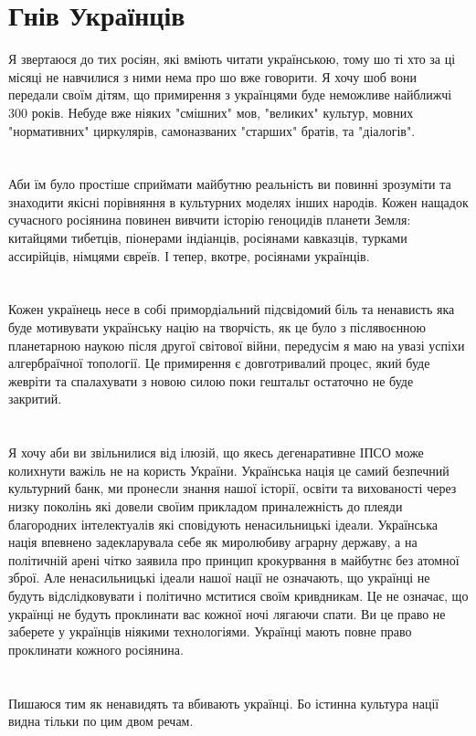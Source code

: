 \section{Гнів Українців}

Я звертаюся до тих росіян, які вміють читати українською, тому шо ті хто за ці місяці не навчилися з ними нема про шо вже говорити. Я хочу шоб вони передали своїм дітям, що примирення з українцями буде неможливе найближчі 300 років. Небуде вже ніяких "смішних" мов, "великих" культур, мовних "нормативних" циркулярів, самоназваних "старших" братів, та "діалогів".\\
\\
\\
Аби їм було простіше сприймати майбутню реальність ви повинні зрозуміти та знаходити якісні порівняння в культурних моделях інших народів. Кожен нащадок сучасного росіянина повинен вивчити історію геноцидів планети Земля: китайцями тибетців, піонерами індіанців, росіянами кавказців, турками ассирійців, німцями євреїв. І тепер, вкотре, росіянами українців.\\
\\
\\
Кожен українець несе в собі примордіальний підсвідомий біль та ненависть яка буде мотивувати українську націю на творчість, як це було з післявоєнною планетарною наукою після другої світової війни, передусім я маю на увазі успіхи алгербраїчної топології. Це примирення є довготривалий процес, який буде жевріти та спалахувати з новою силою поки гештальт остаточно не буде закритий.\\
\\
\\
Я хочу аби ви звільнилися від ілюзій, що якесь дегенаративне ІПСО може колихнути важіль не на користь України. Українська нація це самий безпечний культурний банк, ми пронесли знання нашої історії, освіти та вихованості через низку поколінь які довели своїим прикладом приналежність до плеяди благородних інтелектуалів які сповідують ненасильницькі ідеали. Українська нація впевнено задекларувала себе як миролюбиву аграрну державу, а на політичній арені чітко заявила про принцип крокурвання в майбутнє без атомної зброї. Але ненасильницькі ідеали нашої нації не означають, що українці не будуть відслідковувати і політично мститися своїм кривдникам. Це не означає, що українці не будуть проклинати вас кожної ночі лягаючи спати. Ви це право не заберете у українців ніякими технологіями. Українці мають повне право проклинати кожного росіянина.\\
\\
\\
Пишаюся тим як ненавидять та вбивають українці. Бо істинна культура нації видна тільки по цим двом речам.\\

\normalsize
